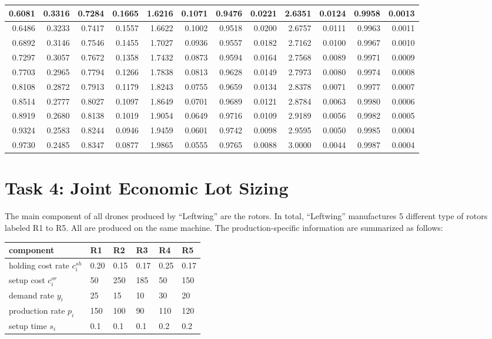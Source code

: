\documentclass[
]{article}
\begin{document}
\begin{table}[H]
\begin{tabular}{r|r|r|>{}r||r|r|r|>{}r||r|r|r|r}
\hline
0.6081 & 0.3316 & 0.7284 & 0.1665 & 1.6216 & 0.1071 & 0.9476 & 0.0221 & 2.6351 & 0.0124 & 0.9958 & 0.0013\\
\hline
0.6486 & 0.3233 & 0.7417 & 0.1557 & 1.6622 & 0.1002 & 0.9518 & 0.0200 & 2.6757 & 0.0111 & 0.9963 & 0.0011\\
\hline
0.6892 & 0.3146 & 0.7546 & 0.1455 & 1.7027 & 0.0936 & 0.9557 & 0.0182 & 2.7162 & 0.0100 & 0.9967 & 0.0010\\
\hline
0.7297 & 0.3057 & 0.7672 & 0.1358 & 1.7432 & 0.0873 & 0.9594 & 0.0164 & 2.7568 & 0.0089 & 0.9971 & 0.0009\\
\hline
0.7703 & 0.2965 & 0.7794 & 0.1266 & 1.7838 & 0.0813 & 0.9628 & 0.0149 & 2.7973 & 0.0080 & 0.9974 & 0.0008\\
\hline
0.8108 & 0.2872 & 0.7913 & 0.1179 & 1.8243 & 0.0755 & 0.9659 & 0.0134 & 2.8378 & 0.0071 & 0.9977 & 0.0007\\
\hline
0.8514 & 0.2777 & 0.8027 & 0.1097 & 1.8649 & 0.0701 & 0.9689 & 0.0121 & 2.8784 & 0.0063 & 0.9980 & 0.0006\\
\hline
0.8919 & 0.2680 & 0.8138 & 0.1019 & 1.9054 & 0.0649 & 0.9716 & 0.0109 & 2.9189 & 0.0056 & 0.9982 & 0.0005\\
\hline
0.9324 & 0.2583 & 0.8244 & 0.0946 & 1.9459 & 0.0601 & 0.9742 & 0.0098 & 2.9595 & 0.0050 & 0.9985 & 0.0004\\
\hline
0.9730 & 0.2485 & 0.8347 & 0.0877 & 1.9865 & 0.0555 & 0.9765 & 0.0088 & 3.0000 & 0.0044 & 0.9987 & 0.0004\\
\hline
\end{tabular}
\end{table}

\hypertarget{task-4-joint-economic-lot-sizing}{%
\section{Task 4: Joint Economic Lot
Sizing}\label{task-4-joint-economic-lot-sizing}}

The main component of all drones produced by ``Leftwing'' are the
rotors. In total, ``Leftwing'' manufactures 5 different type of rotors
labeled R1 to R5. All are produced on the same machine. The
production-specific information are summarized as follows:

\begin{longtable}[]{@{}llllll@{}}
\toprule
component & R1 & R2 & R3 & R4 & R5\tabularnewline
\midrule
\endhead
holding cost rate \(c^{sh}_i\) & 0.20 & 0.15 & 0.17 & 0.25 &
0.17\tabularnewline
setup cost \(c^{or}_i\) & 50 & 250 & 185 & 50 & 150\tabularnewline
demand rate \(y_i\) & 25 & 15 & 10 & 30 & 20\tabularnewline
production rate \(p_i\) & 150 & 100 & 90 & 110 & 120\tabularnewline
setup time \(s_i\) & 0.1 & 0.1 & 0.1 & 0.2 & 0.2\tabularnewline
\bottomrule
\end{longtable}
\end{document}
